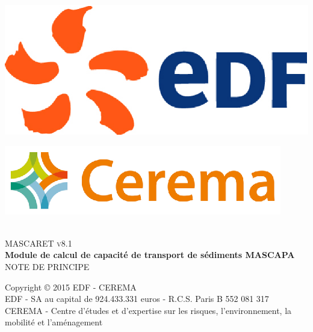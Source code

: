 \documentclass[a4paper,10pt]{article}
\begin{document}
\begin{titlepage}
\begin{center}

\begin{minipage}{0.4\textwidth}
\begin{flushleft} \large
\includegraphics[scale=0.4]{./EDF_Logo}
\end{flushleft}
\end{minipage}
\begin{minipage}{0.4\textwidth}
\begin{flushright} \large
\includegraphics[scale=1.]{./CEREMA_Logo}
\end{flushright}
\end{minipage}

\textsc{ }\\[7cm]
\textsc{\Huge MASCARET v8.1}\\[1cm]
{ \huge \bfseries Module de calcul de capacit\'e de transport de s\'ediments MASCAPA}\\[1cm]
\textsc{\Large NOTE DE PRINCIPE}\\
\vfill

{\Large Copyright {\copyright} 2015 EDF - CEREMA}\\[0.5cm]
{EDF - SA au capital de 924.433.331 euros - R.C.S. Paris B 552 081 317}\\
{CEREMA - Centre d'\'etudes et d'expertise sur les risques, l'environnement, la mobilit\'e et l'am\'enagement}

\end{center}
\end{titlepage}
\end{document}
